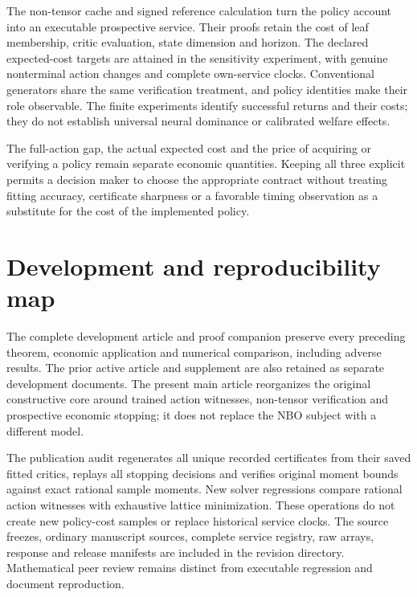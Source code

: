 \documentclass[ecta,nameyear,draft]{econsocart}
\begin{document}
The non-tensor cache and signed reference calculation turn the policy account into an executable prospective service. Their proofs retain the cost of leaf membership, critic evaluation, state dimension and horizon. The declared expected-cost targets are attained in the sensitivity experiment, with genuine nonterminal action changes and complete own-service clocks. Conventional generators share the same verification treatment, and policy identities make their role observable. The finite experiments identify successful returns and their costs; they do not establish universal neural dominance or calibrated welfare effects.

The full-action gap, the actual expected cost and the price of acquiring or verifying a policy remain separate economic quantities. Keeping all three explicit permits a decision maker to choose the appropriate contract without treating fitting accuracy, certificate sharpness or a favorable timing observation as a substitute for the cost of the implemented policy.

\appendix
\section{Development and reproducibility map}\label{sec:map56}
The complete development article and proof companion preserve every preceding theorem, economic application and numerical comparison, including adverse results. The prior active article and supplement are also retained as separate development documents. The present main article reorganizes the original constructive core around trained action witnesses, non-tensor verification and prospective economic stopping; it does not replace the NBO subject with a different model.

The publication audit regenerates all unique recorded certificates from their saved fitted critics, replays all stopping decisions and verifies original moment bounds against exact rational sample moments. New solver regressions compare rational action witnesses with exhaustive lattice minimization. These operations do not create new policy-cost samples or replace historical service clocks. The source freezes, ordinary manuscript sources, complete service registry, raw arrays, response and release manifests are included in the revision directory. Mathematical peer review remains distinct from executable regression and document reproduction.



\end{document}
